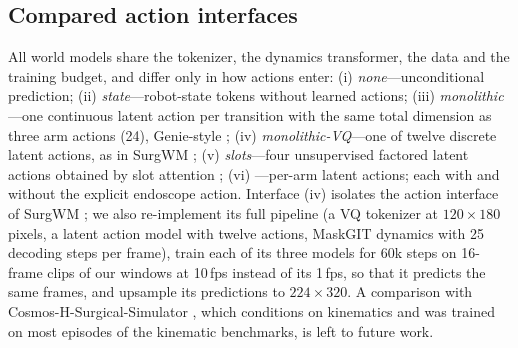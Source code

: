 \subsection{Compared action interfaces}
All world models share the tokenizer, the dynamics transformer, the data and the training budget, and differ only in how actions enter:
(i) \emph{none}---unconditional prediction;
(ii) \emph{state}---robot-state tokens without learned actions;
(iii) \emph{monolithic}---one continuous latent action per transition with the same total dimension as three arm actions (24), Genie-style \cite{genie};
(iv) \emph{monolithic-VQ}---one of twelve discrete latent actions, as in SurgWM \cite{surgwm};
(v) \emph{slots}---four unsupervised factored latent actions obtained by slot attention \cite{slotattn,flam};
(vi) \method{}---per-arm latent actions; each with and without the explicit endoscope action. Interface (iv) isolates the action interface of SurgWM \cite{surgwm}; we also re-implement its full pipeline (a VQ tokenizer at $120\times180$ pixels, a latent action model with twelve actions, MaskGIT \cite{maskgit} dynamics with 25 decoding steps per frame), train each of its three models for 60k steps on 16-frame clips of our windows at 10\,fps instead of its 1\,fps, so that it predicts the same frames, and upsample its predictions to $224\times320$. A comparison with Cosmos-H-Surgical-Simulator \cite{openh}, which conditions on kinematics and was trained on most episodes of the kinematic benchmarks, is left to future work.

